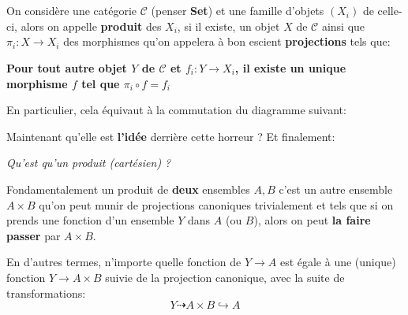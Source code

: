 \documentclass{report}
\begin{document}
\chapter*{}
\subsection*{}
On considère une catégorie \(\mathcal{C}\) (penser \textbf{Set}) et une famille d'objets \((X_i)\) de celle-ci, alors on appelle \textbf{produit} des \(X_i\), si il existe, un objet \(X\) de \(\mathcal{C}\) ainsi que \(\pi_i : X \longrightarrow X_i\) des morphismes qu'on appelera à bon escient \textbf{projections} tels que:
\begin{center}
   \textbf{Pour tout autre objet \(Y\) de \(\mathcal{C}\) et \(f_i : Y \longrightarrow X_i\), il existe un unique morphisme \(f\) tel que \(\pi_i \circ f = f_i\)}
\end{center}
En particulier, cela équivaut à la commutation du diagramme suivant:
\begin{center}
\end{center}
Maintenant qu'elle est \textbf{l'idée} derrière cette horreur ? Et finalement:
\begin{center}
   \textit{Qu'est qu'un produit (cartésien) ?}
\end{center}
Fondamentalement un produit de \textbf{deux} ensembles \(A, B\) c'est un autre ensemble \(A \times B\) qu'on peut munir de projections canoniques trivialement et tels que si on prends une fonction d'un ensemble \(Y\) dans \(A\) (ou \(B\)), alors on peut \textbf{la faire passer} par \(A \times B\).\<

En d'autres termes, n'importe quelle fonction de \(Y \longrightarrow A\) est égale à une (unique) fonction \(Y \longrightarrow A \times B\) suivie de la projection canonique, avec la suite de transformations:
\[
   Y \dashrightarrow A \times B \hookrightarrow A
\]
\end{document}
